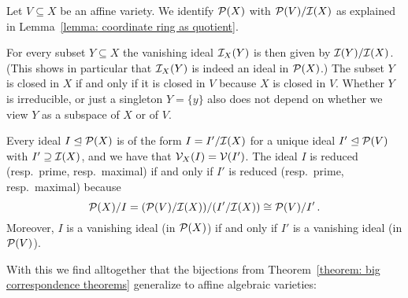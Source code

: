 \begin{fluff}
  Let $V \subseteq X$ be an affine variety.
  We identify $\mathcal{P}(X)$ with $\mathcal{P}(V)/\mathcal{I}(X)$ as explained in Lemma~\ref{lemma: coordinate ring as quotient}.
  
  For every subset $Y \subseteq X$ the vanishing ideal $\mathcal{I}_X(Y)$ is then given by $\mathcal{I}(Y)/\mathcal{I}(X)$.
  (This shows in particular that $\mathcal{I}_X(Y)$ is indeed an ideal in $\mathcal{P}(X)$.)
  The subset $Y$ is closed in $X$ if and only if it is closed in $V$ because $X$ is closed in $V$.
  Whether $Y$ is irreducible, or just a singleton $Y = \{y\}$ also does not depend on whether we view $Y$ as a subspace of $X$ or of $V$.
  
  Every ideal $I \trianglelefteq \mathcal{P}(X)$ is of the form $I = I'/\mathcal{I}(X)$ for a unique ideal $I' \trianglelefteq \mathcal{P}(V)$ with $I' \supseteq \mathcal{I}(X)$, and we have that $\mathcal{V}_X(I) = \mathcal{V}(I')$.
  The ideal $I$ is reduced (resp.\ prime, resp.\ maximal) if and only if $I'$ is reduced (resp.\ prime, resp.\ maximal) because
  \[
          \mathcal{P}(X)/I
    =     ( \mathcal{P}(V)/\mathcal{I}(X) ) / ( I'/\mathcal{I}(X) )
    \cong \mathcal{P}(V)/I' \,.
  \]
  Moreover, $I$ is a vanishing ideal (in $\mathcal{P}(X)$) if and only if $I'$ is a vanishing ideal (in $\mathcal{P}(V)$).
  
  With this we find alltogether that the bijections from Theorem~\ref{theorem: big correspondence theorems} generalize to affine algebraic varieties:
\end{fluff}


